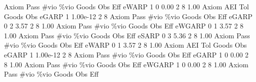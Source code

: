 {\smallskip}
{\smallskip}
       Axiom {\VBAR} Pass        \#vio        \%vio       Goods         Obs         Eff  
       eWARP {\VBAR}    1           0        0.00           2           8        1.00  
{\smallskip}
       Axiom {\VBAR}       AEI        Tol      Goods        Obs 
       eGARP {\VBAR}         1   1.00e-12          2          8 
{\smallskip}
{\smallskip}
{\smallskip}
       Axiom {\VBAR} Pass        \#vio        \%vio       Goods         Obs         Eff  
       eGARP {\VBAR}    0           2        3.57           2           8        1.00  
{\smallskip}
{\smallskip}
{\smallskip}
       Axiom {\VBAR} Pass        \#vio        \%vio       Goods         Obs         Eff  
      eWGARP {\VBAR}    0           1        3.57           2           8        1.00  
{\smallskip}
{\smallskip}
{\smallskip}
       Axiom {\VBAR} Pass        \#vio        \%vio       Goods         Obs         Eff  
       eSARP {\VBAR}    0           3        5.36           2           8        1.00  
{\smallskip}
{\smallskip}
{\smallskip}
       Axiom {\VBAR} Pass        \#vio        \%vio       Goods         Obs         Eff  
       eWARP {\VBAR}    0           1        3.57           2           8        1.00  
{\smallskip}
       Axiom {\VBAR}       AEI        Tol      Goods        Obs 
       eGARP {\VBAR}         1   1.00e-12          2          8 
{\smallskip}
{\smallskip}
{\smallskip}
       Axiom {\VBAR} Pass        \#vio        \%vio       Goods         Obs         Eff  
       eGARP {\VBAR}    1           0        0.00           2           8        1.00  
{\smallskip}
{\smallskip}
{\smallskip}
       Axiom {\VBAR} Pass        \#vio        \%vio       Goods         Obs         Eff  
      eWGARP {\VBAR}    1           0        0.00           2           8        1.00  
{\smallskip}
{\smallskip}
{\smallskip}
       Axiom {\VBAR} Pass        \#vio        \%vio       Goods         Obs         Eff  
